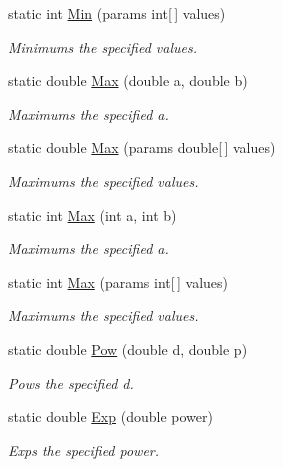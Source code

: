 \begin{DoxyCompactItemize}
static int \hyperlink{struct_unity_engine_1_1_mathd_a7b927fa42f53f8ef0761e5c7d6e3e648}{Min} (params int\mbox{[}$\,$\mbox{]} values)
\begin{DoxyCompactList}\small\item\em Minimums the specified values. \end{DoxyCompactList}\item 
static double \hyperlink{struct_unity_engine_1_1_mathd_aa86f8014b7dcfd8a07ab6e037de6b98a}{Max} (double a, double b)
\begin{DoxyCompactList}\small\item\em Maximums the specified a. \end{DoxyCompactList}\item 
static double \hyperlink{struct_unity_engine_1_1_mathd_a53c22ef2ad61e4dbf4cdcdb38eb5f325}{Max} (params double\mbox{[}$\,$\mbox{]} values)
\begin{DoxyCompactList}\small\item\em Maximums the specified values. \end{DoxyCompactList}\item 
static int \hyperlink{struct_unity_engine_1_1_mathd_ac3a242dc16f7b50b609cb03110e9be2a}{Max} (int a, int b)
\begin{DoxyCompactList}\small\item\em Maximums the specified a. \end{DoxyCompactList}\item 
static int \hyperlink{struct_unity_engine_1_1_mathd_ab382aa0367934caaa4893e524e574be5}{Max} (params int\mbox{[}$\,$\mbox{]} values)
\begin{DoxyCompactList}\small\item\em Maximums the specified values. \end{DoxyCompactList}\item 
static double \hyperlink{struct_unity_engine_1_1_mathd_a0a9bd630241ac228034ef95e1ff9a7fc}{Pow} (double d, double p)
\begin{DoxyCompactList}\small\item\em Pows the specified d. \end{DoxyCompactList}\item 
static double \hyperlink{struct_unity_engine_1_1_mathd_a605231eb33ba3f5baa93f994e98a359f}{Exp} (double power)
\begin{DoxyCompactList}\small\item\em Exps the specified power. \end{DoxyCompactList}\item 

\end{DoxyCompactItemize}
